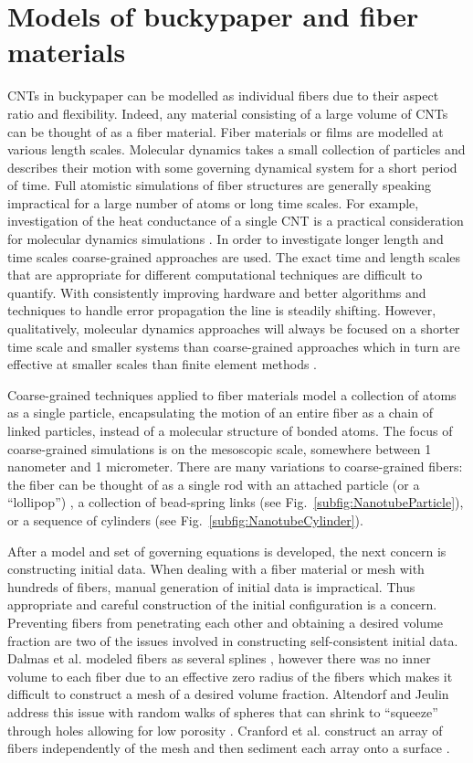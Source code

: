 \section{Models of buckypaper and fiber materials}

	CNTs in buckypaper can be modelled as individual fibers due to their aspect ratio and flexibility. Indeed, any material consisting of a large volume of CNTs can be thought of as a fiber material. Fiber materials or films are modelled at various length scales. Molecular dynamics takes a small collection of particles and describes their motion with some governing dynamical system for a short period of time. Full atomistic simulations of fiber structures are generally speaking impractical for a large number of atoms or long time scales. For example, investigation of the heat conductance of a single CNT is a practical consideration for molecular dynamics simulations \cite{Maruyama2003}. In order to investigate longer length and time scales coarse-grained approaches are used. The exact time and length scales that are appropriate for different computational techniques are difficult to quantify. With consistently improving hardware and better algorithms and techniques to handle error propagation the line is steadily shifting. However, qualitatively, molecular dynamics approaches will always be focused on a shorter time scale and smaller systems than coarse-grained approaches which in turn are effective at smaller scales than finite element methods \cite{Muller2002}.
	
	Coarse-grained techniques applied to fiber materials model a collection of atoms as a single particle, encapsulating the motion of an entire fiber as a chain of linked particles, instead of a molecular structure of bonded atoms. The focus of coarse-grained simulations is on the mesoscopic scale, somewhere between 1 nanometer and 1 micrometer.  There are many variations to coarse-grained fibers: the fiber can be thought of as a single rod with an attached particle (or a ``lollipop'') \cite{Buehler2006}, a collection of bead-spring links \cite{Li2012} (see Fig.~\ref{subfig:NanotubeParticle}), or a sequence of cylinders \cite{Volkov2008} (see Fig.~\ref{subfig:NanotubeCylinder}).
	
After a model and set of governing equations is developed, the next concern is constructing initial data.
When dealing with a fiber material or mesh with hundreds of fibers, manual generation of initial data is impractical.
Thus appropriate and careful construction of the initial configuration is a concern.
Preventing fibers from penetrating each other and obtaining a desired volume fraction are two of the issues involved in constructing self-consistent initial data.
Dalmas et al. modeled fibers as several splines \cite{Dalmas2006}, however there was no inner volume to each fiber due to an effective zero radius of the fibers which makes it difficult to construct a mesh of a desired volume fraction.
Altendorf and Jeulin address this issue with random walks of spheres that can shrink to ``squeeze'' through holes allowing for low porosity \cite{Altendorf2011}.
Cranford et al. construct an array of fibers independently of the mesh and then sediment each array onto a surface \cite{Cranford2010}.

